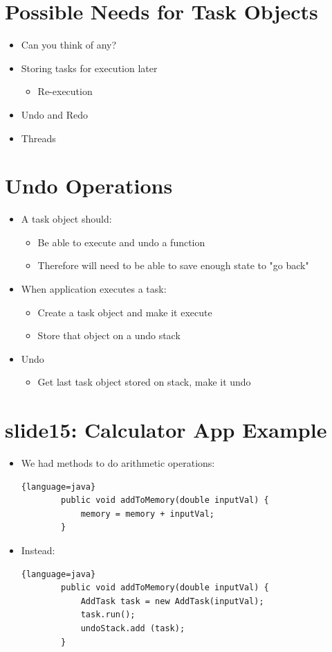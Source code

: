 \documentclass[12pt, a4paper]{book}
\begin{document}
\section{Possible Needs for Task Objects}
\begin{itemize}
    \item Can you think of any?
    \item Storing tasks for execution later
          \begin{itemize}
              \item Re-execution
          \end{itemize}
    \item Undo and Redo
    \item Threads
\end{itemize}

\section{Undo Operations}
\begin{itemize}
    \item A task object should:
          \begin{itemize}
              \item Be able to execute and undo a function
              \item Therefore will need to be able to save enough state to "go back"
          \end{itemize}
    \item When application executes a task:
          \begin{itemize}
              \item Create a task object and make it execute
              \item Store that object on a undo stack
          \end{itemize}
    \item Undo
          \begin{itemize}
              \item Get last task object stored on stack, make it undo
          \end{itemize}
\end{itemize}

\section{slide15: Calculator App Example}
\begin{itemize}
    \item We had methods to do arithmetic operations:
          \begin{lstlisting}{language=java}
        public void addToMemory(double inputVal) {
            memory = memory + inputVal;
        }
    \end{lstlisting}
    \item Instead:
          \begin{lstlisting}{language=java}
        public void addToMemory(double inputVal) {
            AddTask task = new AddTask(inputVal);
            task.run();
            undoStack.add (task);
        }
    \end{lstlisting}
\end{itemize}
\end{document}
